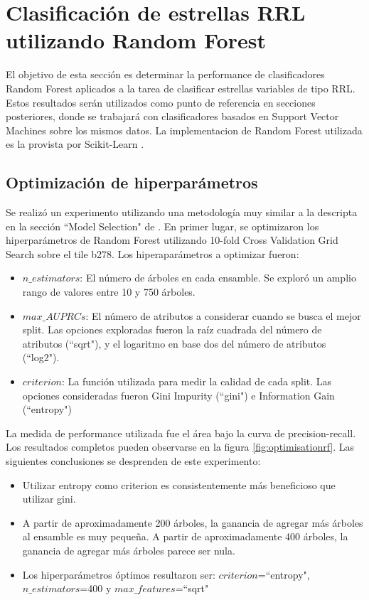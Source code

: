 \chapter{Clasificación de estrellas RRL utilizando Random Forest}

El objetivo de esta sección es determinar la performance de clasificadores Random Forest aplicados a la tarea de clasificar estrellas variables de tipo RRL. Estos resultados serán utilizados como punto de referencia en secciones posteriores, donde se trabajará con clasificadores basados en Support Vector Machines sobre los mismos datos. La implementacion de Random Forest utilizada es la provista por Scikit-Learn \cite{sklearn_api} \cite{pedregosa2011scikit}.

\section{Optimización de hiperparámetros}

Se realizó un experimento utilizando una metodología muy similar a la descripta en la sección ``Model Selection" de \cite{jbc}. En primer lugar, se optimizaron los hiperparámetros de Random Forest utilizando 10-fold Cross Validation Grid Search sobre el tile b278. Los hiperaparámetros a optimizar fueron:

\begin{itemize}
\item \textbf{$n\_estimators$}: El número de árboles en cada ensamble. Se exploró un amplio rango de valores entre 10 y 750 árboles.
\item \textbf{$max\_AUPRCs$}: El número de atributos a considerar cuando se busca el mejor split. Las opciones exploradas fueron la raíz cuadrada del número de atributos (``sqrt"), y el logaritmo en base dos del número de atributos (``log2").
\item \textbf{$criterion$}: La función utilizada para medir la calidad de cada split. Las opciones consideradas fueron Gini Impurity (``gini") e Information Gain (``entropy")
\end{itemize}

La medida de performance utilizada fue el área bajo la curva de precision-recall. Los resultados completos pueden observarse en la figura \ref{fig:optimisationrf}. Las siguientes conclusiones se desprenden de este experimento:

\begin{itemize}
\item Utilizar entropy como criterion es consistentemente más beneficioso que utilizar gini.
\item A partir de aproximadamente 200 árboles, la ganancia de agregar más árboles al ensamble es muy pequeña. A partir de aproximadamente 400 árboles, la ganancia de agregar más árboles parece ser nula.
\item Los hiperparámetros óptimos resultaron ser: $criterion$=``entropy", $n\_estimators$=400 y $max\_features$=``sqrt"
\end{itemize}

